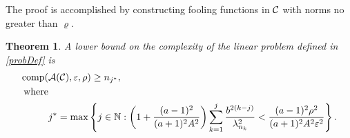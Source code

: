 \documentclass[final]{elsarticle}
\newtheorem{theorem}{Theorem}
\theoremstyle{definition}
\theoremstyle{remark}
\begin{document}
The proof is accomplished by constructing fooling functions in $\mathcal{C}$ with norms no greater than $\varrho$.


\begin{theorem} \label{thm:lowbdcomp}
A lower bound on the complexity of the linear problem defined in \eqref{probDef} is
\begin{subequations} \label{compbd}
\begin{align}
 \label{compbdA}
\operatorname{comp}(&\mathcal{A}(\mathcal{C}),\varepsilon,\rho) \ge n_{j^*},  \\
\nonumber
\text{where} & \\
\label{compbdB}
& j^* = \max \left \{ j \in \mathbb{N} : \left(1+\frac{(a-1)^2}{(a+1)^{2} A^2 }\right)\sum_{k=1}^j \frac{b^{2(k-j)}}{\lambda_{n_{k}}^2}   < 
\frac{(a-1)^2\rho^2}{(a+1)^2A^2\varepsilon^2}
\right \}.
\end{align}
\end{subequations}
\end{theorem}
\end{document}
